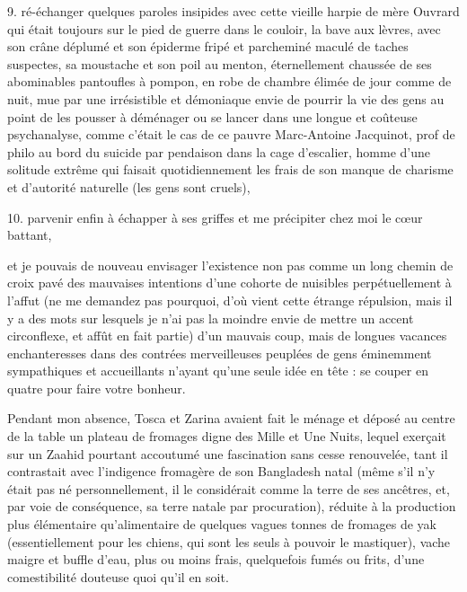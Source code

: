 9. ré-échanger quelques paroles insipides avec cette vieille harpie de mère Ouvrard qui était toujours sur le pied de guerre dans le couloir, la bave aux lèvres, avec son crâne déplumé et son épiderme fripé et parcheminé maculé de taches suspectes, sa moustache et son poil au menton, éternellement chaussée de ses abominables pantoufles à pompon, en robe de chambre élimée de jour comme de nuit, mue par une irrésistible et démoniaque envie de pourrir la vie des gens au point de les pousser à déménager ou se lancer dans une longue et coûteuse psychanalyse, comme c’était le cas de ce pauvre Marc-Antoine Jacquinot, prof de philo au bord du suicide par pendaison dans la cage d’escalier, homme d’une solitude extrême qui faisait quotidiennement les frais de son manque de charisme et d’autorité naturelle (les gens sont cruels),

10. parvenir enfin à échapper à ses griffes et me précipiter chez moi le cœur battant,

et je pouvais de nouveau envisager l’existence non pas comme un long chemin de croix pavé des mauvaises intentions d’une cohorte de nuisibles perpétuellement à l’affut (ne me demandez pas pourquoi, d’où vient cette étrange répulsion, mais il y a des mots sur lesquels je n’ai pas la moindre envie de mettre un accent circonflexe, et affût en fait partie) d’un mauvais coup, mais de longues vacances enchanteresses dans des contrées merveilleuses peuplées de gens éminemment sympathiques et accueillants n’ayant qu’une seule idée en tête : se couper en quatre pour faire votre bonheur.

Pendant mon absence, Tosca et Zarina avaient fait le ménage et déposé au centre de la table un plateau de fromages digne des Mille et Une Nuits, lequel exerçait sur un Zaahid pourtant accoutumé une fascination sans cesse renouvelée, tant il contrastait avec l’indigence fromagère de son Bangladesh natal (même s’il n’y était pas né personnellement, il le considérait comme la terre de ses ancêtres, et, par voie de conséquence, sa terre natale par procuration), réduite à la production plus élémentaire qu’alimentaire de quelques vagues tonnes de fromages de yak (essentiellement pour les chiens, qui sont les seuls à pouvoir le mastiquer), vache maigre et buffle d’eau, plus ou moins frais, quelquefois fumés ou frits, d’une comestibilité douteuse quoi qu’il en soit.


